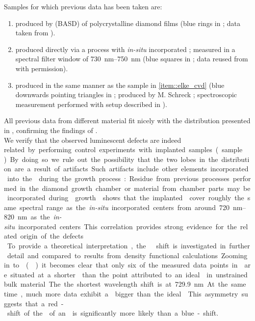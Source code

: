 	Samples for which previous data has been taken are:
	\begin{enumerate}
		\item \nds produced by \basd (BASD) of polycrystalline \CVD diamond films (blue rings in  \cite{Neu2011a}; data taken from \cite{Benedikter2017a}).
		\item \label{item::elke_cvd}\nds produced directly via a \CVD process with \textit{in-situ} incorporated \sivs; measured in a spectral filter window of \SIrange{730}{750}{nm} (blue squares in ; data reused from \cite{Neu2012} with permission).
		\item \nds produced in the same manner as the \CVD sample in \ref{item::elke_cvd} (blue downwards pointing triangles in ; produced by M. Schreck \cite{Neu2011b}; spectroscopic measurement performed with setup described in ).
	\end{enumerate}
	
	All previous data from different \nd material fit nicely with the \ZPL distribution presented in , confirming the findings of .
	\\
	We verify that the observed luminescent defects are indeed \si related by performing control experiments with \si implanted samples (sample \implantedTao).
	By doing so we rule out the possibility that the two lobes in the distribution are a result of artifacts.
	Such artifacts include other elements incorporated into the \nds during the growth process: Residue from previous processes performed in the diamond growth chamber or material from chamber parts may be incorporated during \nd growth.
	 shows that the implanted \sivs cover roughly the same spectral range as the \textit{in-situ} incorporated centers from around \SIrange{720}{820}{nm} as the \textit{in-situ} incorporated centers.
	This correlation provides strong evidence for the \si related origin of the defects.
	\\
	To provide a theoretical interpretation, the \ZPL \cwl shift is investigated in further detail and compared to results from density functional calculations.
	Zooming in to \vl () it becomes clear that only six of the measured data points in \vl are situated at a shorter \cwl than the point attributed to an ideal \siv in unstrained bulk material.
	The the shortest wavelength shift is at \SI{729.9}{nm}.
	At the same time, much more data exhibit a \cwl bigger than the ideal \siv.
	This asymmetry suggests that a red-shift of the \ZPL of an \siv is significantly more likely than a blue-shift.

